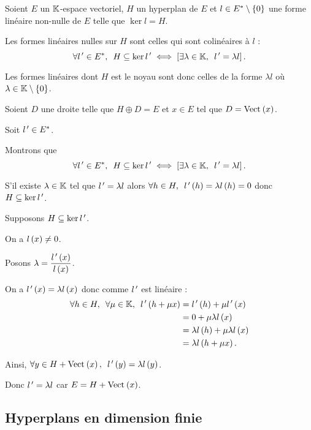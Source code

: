 \begin{prop}
Soient \(E\) un \(\mathbb{K}\)-espace vectoriel, \(H\) un hyperplan de \(E\) et \(l\in E^{*}\setminus\left\lbrace0\right\rbrace\) une forme linéaire non-nulle de \(E\) telle que \(\ker l=H\).

Les formes linéaires nulles sur \(H\) sont celles qui sont colinéaires à \(l\) : \[\quantifs{\forall l\prim\in E\etoile}H\subset\ker l\prim\ssi\croch{\quantifs{\exists\lambda\in\K}l\prim=\lambda l}.\]

Les formes linéaires dont \(H\) est le noyau sont donc celles de la forme \(\lambda l\) où \(\lambda\in\mathbb{K}\setminus\left\lbrace0\right\rbrace\).
\end{prop}

\begin{dem}
Soient \(D\) une droite telle que \(H\oplus D=E\) et \(x\in E\) tel que \(D=\Vect{x}\).

Soit \(l^{\,\prime}\in E^{*}\).

Montrons que \[\quantifs{\forall l\prim\in E\etoile}H\subset\ker l\prim\ssi\croch{\quantifs{\exists\lambda\in\K}l\prim=\lambda l}.\]

\imprec S'il existe \(\lambda\in\mathbb{K}\) tel que \(l^{\,\prime}=\lambda l\) alors \(\quantifs{\forall h\in H}l\prim\paren{h}=\lambda l\paren{h}=0\) donc \(H\subseteq\ker l^{\,\prime}\).

\impdir

Supposons \(H\subseteq\ker l^{\,\prime}\).

On a \(l\left(x\right)\not=0\).

Posons \(\lambda=\dfrac{l^{\,\prime}\left(x\right)}{l\left(x\right)}\).

On a \(l^{\,\prime}\left(x\right)=\lambda l\left(x\right)\) donc comme \(l^{\,\prime}\) est linéaire : \[\begin{aligned}
\quantifs{\forall h\in H;\forall\mu\in\K}l\prim\paren{h+\mu x}&=l\prim\paren{h}+\mu l\prim\paren{x} \\
&=0+\mu\lambda l\paren{x} \\
&=\lambda l\paren{h}+\mu\lambda l\paren{x} \\
&=\lambda l\paren{h+\mu x}.
\end{aligned}\]

Ainsi, \(\quantifs{\forall y\in H+\Vect{x}}l\prim\paren{y}=\lambda l\paren{y}\).

Donc \(l^{\,\prime}=\lambda l\) car \(E=H+\Vect{x}\).
\end{dem}

\subsection{Hyperplans en dimension finie}

